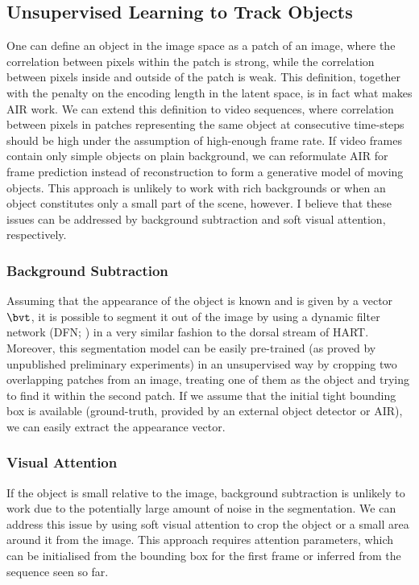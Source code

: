 \subsection{Unsupervised Learning to Track Objects}
\label{sec:obj}

    One can define an object in the image space as a patch of an image, where the correlation between pixels within the patch is strong, while the correlation between pixels inside and outside of the patch is weak. This definition, together with the penalty on the encoding length in the latent space, is in fact what makes AIR work. We can extend this definition to video sequences, where correlation between pixels in patches representing the same object at consecutive time-steps should be high under the assumption of high-enough frame rate. If video frames contain only simple objects on plain background, we can reformulate AIR for frame prediction instead of reconstruction to form a generative model of moving objects. This approach is unlikely to work with rich backgrounds or when an object constitutes only a small part of the scene, however. I believe that these issues can be addressed by background subtraction and soft visual attention, respectively. 
    
    \subsubsection{Background Subtraction}
    
        Assuming that the appearance of the object is known and is given by a vector $\bvt$, it is possible to segment it out of the image by using a dynamic filter network (DFN; \cite{Brabandere2016dfn}) in a very similar fashion to the dorsal stream of HART. Moreover, this segmentation model can be easily pre-trained (as proved by unpublished preliminary experiments) in an unsupervised way by cropping two overlapping patches from an image, treating one of them as the object and trying to find it within the second patch. If we assume that the initial tight bounding box is available (ground-truth, provided by an external object detector or AIR), we can easily extract the appearance vector.
    
    \subsubsection{Visual Attention}
        If the object is small relative to the image, background subtraction is unlikely to work due to the potentially large amount of noise in the segmentation. We can address this issue by using soft visual attention to crop the object or a small area around it from the image. This approach requires attention parameters, which can be initialised from the bounding box for the first frame or inferred from the sequence seen so far. 
  
